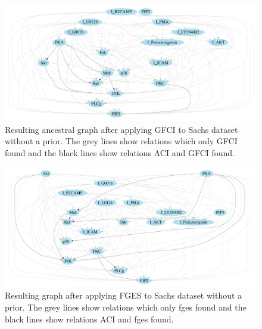 \documentclass[a4paper,pdf]{article}
\begin{document}
\begin{figure}[!ht]
    \centering
    \includegraphics[width=\textwidth]{additional/sachsAncGraph_bootstrap0_priorFALSEgfci}
    \caption{Resulting ancestral graph after applying GFCI to Sachs dataset without a prior. The grey lines show relations which only GFCI found and the black lines show relations ACI and GFCI found. \label{fig:sachspagnopriorgfcianc}}
\end{figure}
\begin{figure}[!ht]
    \centering
    \includegraphics[width=\textwidth]{additional/sachsAncGraph_bootstrap0_priorFALSEfges}
    \caption{Resulting graph after applying FGES to Sachs dataset without a prior. The grey lines show relations which only fges found and the black lines show relations ACI and fges found. \label{fig:sachspagnopriorfgesanc}}
\end{figure}

\newpage %
\end{document}

